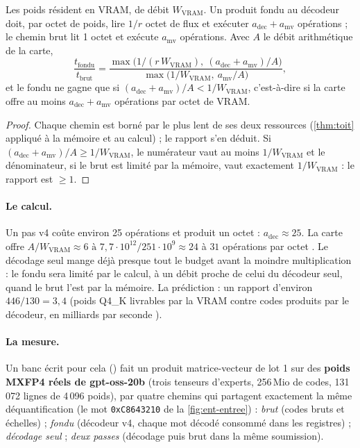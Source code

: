 \begin{proposition}\label{prop:ent-fondre}
Les poids résident en VRAM, de débit $W_{\mathrm{VRAM}}$. Un produit fondu au décodeur doit, par octet de poids, lire $1/r$ octet de flux et exécuter $a_{\mathrm{dec}} + a_{\mathrm{mv}}$ opérations ; le chemin brut lit 1 octet et exécute $a_{\mathrm{mv}}$ opérations. Avec $A$ le débit arithmétique de la carte,
\begin{equation}\label{eq:ent-fondre}
\frac{t_{\mathrm{fondu}}}{t_{\mathrm{brut}}} = \frac{\max\bigl(1/(r\,W_{\mathrm{VRAM}}),\ (a_{\mathrm{dec}} + a_{\mathrm{mv}})/A\bigr)}{\max\bigl(1/W_{\mathrm{VRAM}},\ a_{\mathrm{mv}}/A\bigr)},
\end{equation}
et le fondu ne gagne que si $(a_{\mathrm{dec}} + a_{\mathrm{mv}})/A < 1/W_{\mathrm{VRAM}}$, c'est-à-dire si la carte offre au moins $a_{\mathrm{dec}} + a_{\mathrm{mv}}$ opérations par octet de VRAM.
\end{proposition}

\begin{proof}
Chaque chemin est borné par le plus lent de ses deux ressources (\cref{thm:toit} appliqué à la mémoire et au calcul) ; le rapport s'en déduit. Si $(a_{\mathrm{dec}} + a_{\mathrm{mv}})/A \ge 1/W_{\mathrm{VRAM}}$, le numérateur vaut au moins $1/W_{\mathrm{VRAM}}$ et le dénominateur, si le brut est limité par la mémoire, vaut exactement $1/W_{\mathrm{VRAM}}$ : le rapport est $\ge 1$.
\end{proof}

\paragraph{Le calcul.} Un pas v4 coûte environ 25 opérations et produit un octet : $a_{\mathrm{dec}} \approx 25$. La carte offre $A/W_{\mathrm{VRAM}} \approx 6\text{ à }7{,}7\cdot10^{12} / 251\cdot10^{9} \approx 24$ à $31$ opérations par octet \calc. Le décodage seul mange déjà presque tout le budget avant la moindre multiplication : le fondu sera limité par le calcul, à un débit proche de celui du décodeur seul, quand le brut l'est par la mémoire. La prédiction : un rapport d'environ $446/130 = 3{,}4$ (poids Q4\_K livrables par la VRAM contre codes produits par le décodeur, en milliards par seconde \calc).

\paragraph{La mesure.} Un banc écrit pour cela () fait un produit matrice-vecteur de lot 1 sur des \textbf{poids MXFP4 réels de gpt-oss-20b} (trois tenseurs d'experts, 256\,Mio de codes, 131\,072 lignes de 4\,096 poids), par quatre chemins qui partagent exactement la même déquantification (le mot \texttt{0xC8643210} de la \cref{fig:ent-entree}) : \emph{brut} (codes bruts et échelles) ; \emph{fondu} (décodeur v4, chaque mot décodé consommé dans les registres) ; \emph{décodage seul} ; \emph{deux passes} (décodage puis brut dans la même soumission).

